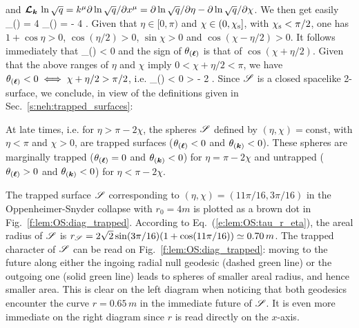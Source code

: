  and
 $\bm{\mathcal{L}}_{\bm{\bm{k}}}\, \ln \sqrt{q} = k^\mu \partial \ln\sqrt{q} /\partial x^\mu =
 \partial \ln\sqrt{q} /\partial \eta - \partial\ln  \sqrt{q} /\partial \chi$.
We then get easily
\be
    \theta_{(\wl)} = 4 
    \qand
    \theta_{()} = - 4  .
\ee
Given that $\eta\in [0,\pi)$ %
and $\chi\in(0,\chi_{\rm s}]$, with $\chi_{\rm s} < \pi/2$,
one has $1 + \cos\eta > 0$, $\cos(\eta/2) > 0$, $\sin\chi > 0$
and $\cos(\chi - \eta/2) > 0$. It follows immediately that
\be
    \theta_{()} < 0
\ee
and the sign of $\theta_{(\bm{\ell})}$ is that of $\cos(\chi + \eta/2)$.
Given that the above ranges of $\eta$ and $\chi$ imply $0 < \chi + \eta/2 < \pi$,
we have $\theta_{(\bm{\ell})} < 0 \iff \chi + \eta/2 > \pi/2$, i.e.
\be \label{e:lem:theta_l_neg}
    \theta_{(\wl)} < 0 \iff \eta > \pi - 2 \chi .
\ee
Since $\mathscr{S}$ is a closed spacelike 2-surface,
we conclude, in view of the definitions given in Sec.~\ref{s:neh:trapped_surfaces}:
\begin{prop}
At late times, i.e. for $\eta > \pi - 2 \chi$, the spheres $\mathscr{S}$ defined
by $(\eta,\chi) = \mathrm{const}$, with $\eta<\pi$ and $\chi>0$,
are trapped surfaces ($\theta_{(\bm{\ell})} < 0$ and $\theta_{(\bm{k})} < 0$).
These spheres are marginally trapped
($\theta_{(\bm{\ell})} = 0$ and $\theta_{(\bm{k})} < 0$)
for $\eta = \pi - 2 \chi$
and untrapped ($\theta_{(\bm{\ell})} > 0$ and $\theta_{(\bm{k})} < 0$) for $\eta <  \pi - 2 \chi$.
\end{prop}

\begin{example}
The trapped surface $\mathscr{S}$ corresponding to $(\eta,\chi) = (11\pi/16, 3\pi/16)$
in the Oppen\-heimer-Snyder collapse with $r_0 = 4 m$
is plotted as a brown dot in Fig.~\ref{f:lem:OS:diag_trapped}. According
to Eq.~(\ref{e:lem:OS:tau_r_eta}), the areal radius of $\mathscr{S}$ is
$r_{\mathscr{S}} = 2\sqrt{2} \sin(3\pi/16) (1 + \cos(11\pi/16)) \simeq 0.70\, m$.
The trapped character of $\mathscr{S}$ can be read on Fig.~\ref{f:lem:OS:diag_trapped}:
moving to the future along either the ingoing radial null geodesic (dashed green line)
or the outgoing one (solid green line) leads to spheres of smaller areal radius,
and hence smaller area. This is clear on the left diagram when noticing
that both geodesics encounter the curve $r=0.65\, m$ in the immediate future of $\mathscr{S}$.
It is even more immediate on the right diagram since $r$ is read directly on the $x$-axis.
\end{example}

